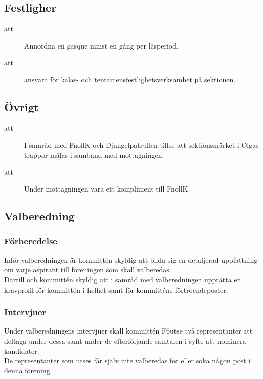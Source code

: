 \subsection{Festligher}
\begin{description}
\item[att] Annordna en gasque minst en gång per läsperiod.

\item[att] ansvara för kalas- och tentamensfestlighetsverksamhet på sektionen. 

\end{description}


\subsection{Övrigt}
\begin{description}
\item[att] I samråd med FnollK och Djungelpatrullen tillse att sektionsmärket i Olgas trappor målas i samband med mottagningen.

\item[att] Under mottagningen vara ett kompliment till FnollK.
\end{description}

\subsection{Valberedning}
\subsubsection{Förberedelse}
Inför valberedningen är kommittén skyldig att bilda sig en detaljerad uppfattning om varje aspirant till föreningen som skall valberedas.\\
Därtill och kommittén skyldig att i samråd med valberedningen upprätta en kravprofil för kommittén i helhet samt för kommitténs förtroendeposter.

\subsubsection{Intervjuer}
Under valberedningens intervjuer skall kommittén F6utse två representanter att deltaga under dessa samt under de efterföljande samtalen i syfte att nominera kandidater.\\
De representanter som utses får själv inte valberedas för eller söka någon post i denna förening.



